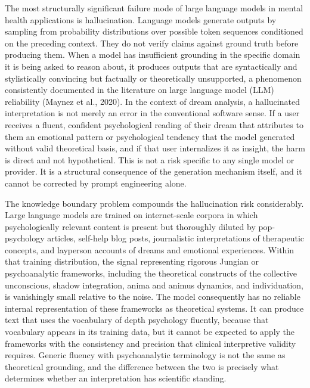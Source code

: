 \documentclass[12pt,a4paper]{report}
\begin{document}
The most structurally significant failure mode of large language models in mental health applications is hallucination. Language models generate outputs by sampling from probability distributions over possible token sequences conditioned on the preceding context. They do not verify claims against ground truth before producing them. When a model has insufficient grounding in the specific domain it is being asked to reason about, it produces outputs that are syntactically and stylistically convincing but factually or theoretically unsupported, a phenomenon consistently documented in the literature on large language model (LLM) reliability (Maynez et al., 2020). In the context of dream analysis, a hallucinated interpretation is not merely an error in the conventional software sense. If a user receives a fluent, confident psychological reading of their dream that attributes to them an emotional pattern or psychological tendency that the model generated without valid theoretical basis, and if that user internalizes it as insight, the harm is direct and not hypothetical. This is not a risk specific to any single model or provider. It is a structural consequence of the generation mechanism itself, and it cannot be corrected by prompt engineering alone.

The knowledge boundary problem compounds the hallucination risk considerably. Large language models are trained on internet-scale corpora in which psychologically relevant content is present but thoroughly diluted by pop-psychology articles, self-help blog posts, journalistic interpretations of therapeutic concepts, and layperson accounts of dreams and emotional experiences. Within that training distribution, the signal representing rigorous Jungian or psychoanalytic frameworks, including the theoretical constructs of the collective unconscious, shadow integration, anima and animus dynamics, and individuation, is vanishingly small relative to the noise. The model consequently has no reliable internal representation of these frameworks as theoretical systems. It can produce text that uses the vocabulary of depth psychology fluently, because that vocabulary appears in its training data, but it cannot be expected to apply the frameworks with the consistency and precision that clinical interpretive validity requires. Generic fluency with psychoanalytic terminology is not the same as theoretical grounding, and the difference between the two is precisely what determines whether an interpretation has scientific standing.
\end{document}
